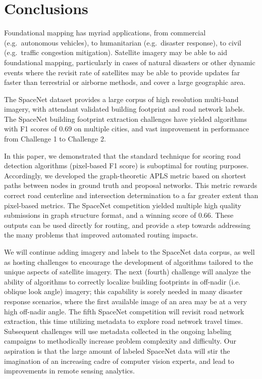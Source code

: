 \documentclass{article}
\begin{document}
\section{Conclusions}\label{conclusions}

Foundational mapping has myriad applications, from commercial (e.g.~autonomous vehicles), to humanitarian (e.g.~disaster response), to civil (e.g.~traffic congestion mitigation).  
Satellite imagery may be able to aid foundational mapping, particularly in cases of natural disasters or other dynamic events where the revisit rate of satellites may be able to provide updates far faster than terrestrial or airborne methods, and cover a large geographic area.

The SpaceNet dataset provides a large corpus of high resolution multi-band imagery, with attendant validated building footprint and road network labels.  The SpaceNet building footprint extraction challenges have yielded algorithms with F1 scores of $0.69$ on multiple cities, and vast improvement in performance from Challenge 1 to Challenge 2.    


In this paper, we demonstrated that the standard technique for scoring road detection algorithms (pixel-based F1 score) is suboptimal for routing purposes. Accordingly, we developed the graph-theoretic APLS metric based on shortest paths between nodes in ground truth and proposal networks. This metric rewards correct road centerline and intersection determination to a far greater extent than pixel-based metrics.  The SpaceNet competition yielded multiple high quality submissions in graph structure format, and a winning score of 0.66.  These outputs can be used directly for routing, and provide a step towards addressing the many problems that improved automated routing impacts.  

We will continue adding imagery and labels to the SpaceNet data corpus, as well as hosting challenges to encourage the development of algorithms tailored to the unique aspects of satellite imagery.  
The next (fourth) challenge will analyze the ability of algorithms to correctly localize building footprints in off-nadir (i.e. oblique look angle) imagery; this capability is sorely needed in many disaster response scenarios, where the first available image of an area may be at a very high off-nadir angle. The fifth SpaceNet competition will revisit road network extraction, this time utilizing metadata to explore road network travel times. Subsequent challenges will use metadata collected in the ongoing labeling campaigns to methodically increase problem complexity and difficulty.
Our aspiration is that the large amount of labeled SpaceNet data will stir the imagination of an increasing cadre of computer vision experts, and lead to improvements in remote sensing analytics.
\end{document}
